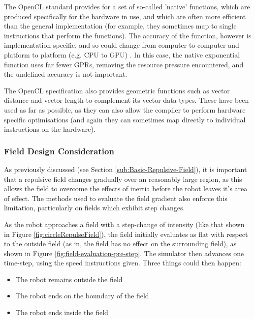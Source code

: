 \documentclass[10pt]{article}
\begin{document}
The OpenCL standard provides for a set of so-called 'native' functions, which
are produced specifically for the hardware in use, and which are often more
efficient than the general implementation (for example, they sometimes map to
single instructions that perform the functions). The accuracy of the function,
however is implementation specific, and so could change from computer to
computer and platform to platform (e.g. CPU to GPU) \cite{openCl11Spec}. In this
case, the native exponential function uses far fewer GPRs, removing the resource
pressure encountered, and the undefined accuracy is not important.

The OpenCL specification also provides geometric functions such as vector
distance and vector length to complement its vector data types. These have been
used as far as possible, as they can also allow the compiler to perform hardware
specific optimisations (and again they can sometimes map directly to individual
instructions on the hardware).\cite{openCl11Spec}

\subsubsection{Field Design Consideration\label{sub:fieldDesignConsiderations}}

As previously discussed (see Section \ref{sub:Basic-Repulsive-Field}), it is
important that a repulsive field changes gradually over an reasonably large
region, as this allows the field to overcome the effects of inertia before the
robot leaves it's area of effect.  The methods used to evaluate the field
gradient also enforce this limitation, particularly on fields which exhibit step
changes.

As the robot approaches a field with a step-change of intensity (like that shown
in Figure \ref{fig:circleRepulseField}), the field initially evaluates as flat
with respect to the outside field (as in, the field has no effect on the surrounding
field), as shown in Figure \ref{fig:field-evaluation-pre-step}.  The simulator
then advances one time-step, using the speed instructions given.  Three things
could then happen:

\begin{itemize}
  \item The robot remains outside the field
  \item The robot ends on the boundary of the field
  \item The robot ends inside the field
\end{itemize}
\end{document}
